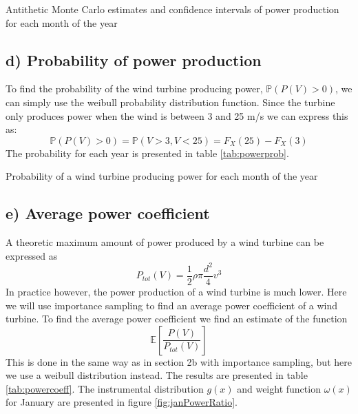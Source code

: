 \documentclass[a4paper]{article}
\begin{document}
\begin{table}[H]
    \centering
    \caption{Antithetic Monte Carlo estimates and confidence intervals of power production for each month of the year}
    \label{tab:ATresults}
    
\end{table}

\subsection*{d) Probability of power production}
To find the probability of the wind turbine producing power, $\mathbb{P}(P(V) > 0)$, we can simply use the weibull probability distribution function. Since the turbine only produces power when the wind is between 3 and 25 m/s we can express this as:
\begin{equation}
    \mathbb{P}(P(V) > 0) = \mathbb{P}(V > 3, V < 25) = F_X(25) - F_X(3)
\end{equation}
The probability for each year is presented in table \ref{tab:powerprob}.

\begin{table}[H]
    \centering
    \caption{Probability of a wind turbine producing power for each month of the year}
    \label{tab:powerprob}
    
\end{table}

\subsection*{e) Average power coefficient}
A theoretic maximum amount of power produced by a wind turbine can be expressed as
\begin{equation}
    P_{tot}(V) = \frac{1}{2}\rho\pi\frac{d^2}{4}v^3
\end{equation}
In practice however, the power production of a wind turbine is much lower. Here we will use importance sampling to find an average power coefficient of a wind turbine. To find the average power coefficient we find an estimate of the function
\begin{equation}
  \mathbb{E}[\frac{P(V)}{P_{tot}(V)}]
\end{equation}
This is done in the same way as in section 2b with importance sampling, but here we use a weibull distribution instead. The results are presented in table \ref{tab:powercoeff}. The instrumental distribution $g(x)$ and weight function $\omega(x)$ for January are presented in figure \ref{fig:janPowerRatio}.
\end{document}
